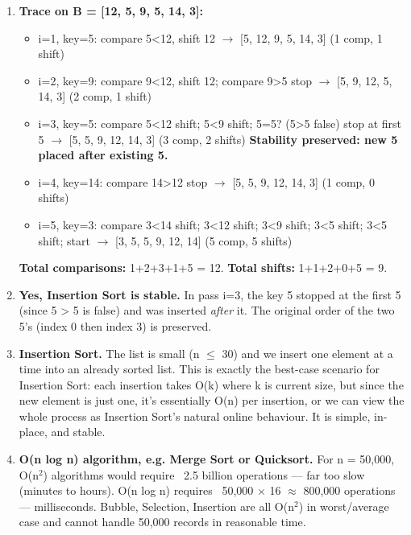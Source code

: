 \documentclass[11pt]{article}
\begin{document}
\begin{corrige}
\begin{enumerate}
    \item \textbf{Trace on B = [12, 5, 9, 5, 14, 3]:}
    \begin{itemize}
        \item i=1, key=5: compare 5<12, shift 12 $\rightarrow$ [5, 12, 9, 5, 14, 3] (1 comp, 1 shift)
        \item i=2, key=9: compare 9<12, shift 12; compare 9>5 stop $\rightarrow$ [5, 9, 12, 5, 14, 3] (2 comp, 1 shift)
        \item i=3, key=5: compare 5<12 shift; 5<9 shift; 5=5? (5>5 false) stop at first 5 $\rightarrow$ [5, 5, 9, 12, 14, 3] (3 comp, 2 shifts) \textbf{Stability preserved: new 5 placed after existing 5.}
        \item i=4, key=14: compare 14>12 stop $\rightarrow$ [5, 5, 9, 12, 14, 3] (1 comp, 0 shifts)
        \item i=5, key=3: compare 3<14 shift; 3<12 shift; 3<9 shift; 3<5 shift; 3<5 shift; start $\rightarrow$ [3, 5, 5, 9, 12, 14] (5 comp, 5 shifts)
    \end{itemize}
    \textbf{Total comparisons:} 1+2+3+1+5 = 12. \textbf{Total shifts:} 1+1+2+0+5 = 9.
    \item \textbf{Yes, Insertion Sort is stable.} In pass i=3, the key 5 stopped at the first 5 (since 5 > 5 is false) and was inserted \emph{after} it. The original order of the two 5's (index 0 then index 3) is preserved.
    \item \textbf{Insertion Sort.} The list is small (n $\le$ 30) and we insert one element at a time into an already sorted list. This is exactly the best-case scenario for Insertion Sort: each insertion takes O(k) where k is current size, but since the new element is just one, it's essentially O(n) per insertion, or we can view the whole process as Insertion Sort's natural online behaviour. It is simple, in-place, and stable.
    \item \textbf{O(n log n) algorithm, e.g. Merge Sort or Quicksort.} For n = 50,000, O(n$^2$) algorithms would require ~2.5 billion operations — far too slow (minutes to hours). O(n log n) requires ~50,000 $\times$ 16 $\approx$ 800,000 operations — milliseconds. Bubble, Selection, Insertion are all O(n$^2$) in worst/average case and cannot handle 50,000 records in reasonable time.
\end{enumerate}
\end{corrige}
\end{document}
